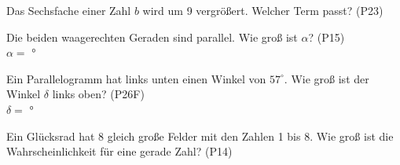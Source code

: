 \documentclass[11pt]{article}
\begin{document}
\begin{aufgabe}{Das Sechsfache einer Zahl $b$ wird um 9 vergrößert. Welcher Term passt? \hfill (P23) \\    }
\end{aufgabe}

\begin{aufgabe}{\begin{minipage}[t]{0.6\linewidth}Die beiden waagerechten Geraden sind parallel. Wie groß ist $\alpha$? \hfill (P15) \\ $\alpha =$ \leerfeld °\end{minipage}\hfill\begin{minipage}[t]{0.37\linewidth}\vspace{0pt}
\end{minipage}}
\end{aufgabe}

\begin{aufgabe}{\begin{minipage}[t]{0.6\linewidth}Ein Parallelogramm hat links unten einen Winkel von $57^\circ$. Wie groß ist der Winkel $\delta$ links oben? \hfill (P26F) \\ $\delta =$ \leerfeld °\end{minipage}\hfill\begin{minipage}[t]{0.37\linewidth}\vspace{0pt}
\end{minipage}}
\end{aufgabe}

\begin{aufgabe}{Ein Glücksrad hat 8 gleich große Felder mit den Zahlen 1 bis 8. Wie groß ist die Wahrscheinlichkeit für eine gerade Zahl? \hfill (P14) \\ \leerfeld}
\end{aufgabe}

\begleitteil
{}
\end{document}
